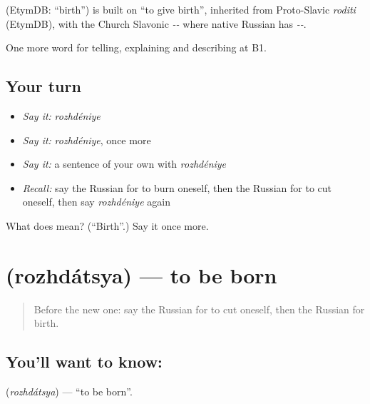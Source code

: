 \begin{cousinweb}
\emph{} (EtymDB: \textquotedblleft{}birth\textquotedblright{}) is built on \emph{} \textquotedblleft{}to give birth\textquotedblright{}, inherited from Proto-Slavic \emph{roditi} (EtymDB), with the Church Slavonic \emph{--} where native Russian has \emph{--}.
\end{cousinweb}

\begin{grammarlens}[title={What you've built}]
One more word for telling, explaining and describing at B1.
\end{grammarlens}

\subsection*{Your turn}
\begin{itemize}
\raggedright
  \item \emph{Say it:} \emph{rozhdéniye}
  \item \emph{Say it:} \emph{rozhdéniye}, once more
  \item \emph{Say it:} a sentence of your own with \emph{rozhdéniye}
  \item \emph{Recall:} say the Russian for to burn oneself, then the Russian for to cut oneself, then say \emph{rozhdéniye} again
\end{itemize}

\begin{tcolorbox}[breakable,colback=teal!4,colframe=teal!35!black,title={Before you move on}]
What does  mean? (\textquotedblleft{}Birth\textquotedblright{}.) Say it once more.
\end{tcolorbox}
\section[\texorpdfstring{\ru{рождаться} (rozhdátsya)}{рождаться (rozhdátsya)}]{ (rozhdátsya) — to be born}

\label{lesson:RU-C303-rozhdatsya}



\begin{quote}
Before the new one: say the Russian for to cut oneself, then the Russian for birth.
\end{quote}

\subsection*{You'll want to know: }
\textbf{} (\emph{rozhdátsya}) — \textquotedblleft{}to be born\textquotedblright{}.

